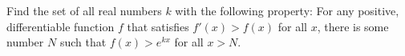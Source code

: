 Find the set of all real numbers $k$ with the following property: For any
positive, differentiable function $f$ that satisfies $f'(x) > f(x)$
for all $x$, there is some number $N$ such that
$f(x) > e^{kx}$ for all $x > N$.
